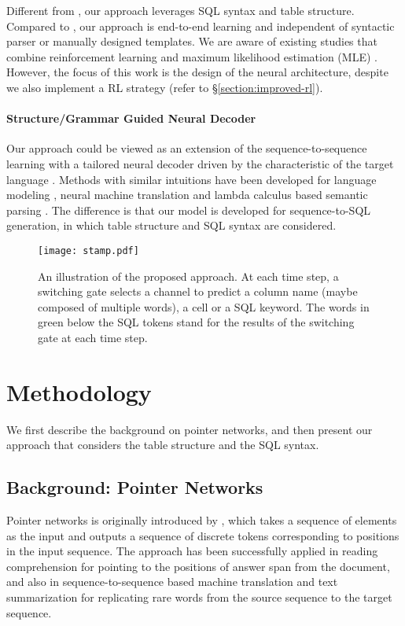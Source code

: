 \documentclass[11pt,a4paper]{article}
\begin{document}
Different from \cite{iyer-EtAl:2017:Long,zhong2017seq2sql}, our approach leverages SQL syntax and table structure.
Compared to \cite{popescu2003towards,giordani2012translating,yaghmazadeh2017type}, our approach is end-to-end learning and independent of syntactic parser or manually designed templates.
We are aware of existing studies that combine reinforcement learning and maximum likelihood estimation (MLE) \cite{guu-EtAl:2017:Long,mou17,liang-EtAl:2017:Long}. However, the focus of this work is the design of the neural architecture, despite we also implement a RL strategy (refer to \S \ref{section:improved-rl}).

\paragraph{Structure/Grammar Guided Neural Decoder}
Our approach could be viewed as an extension of the sequence-to-sequence learning \cite{sutskever2014sequence,Bahdanau2015} with a tailored neural decoder driven by the characteristic of the target language \cite{yin2017syntactic,rabinovich2017abstract}.
Methods with similar intuitions have been developed for language modeling \cite{dyer-EtAl:2016:N16-1}, neural machine translation \cite{wu-EtAl:2017:Long2} and lambda calculus based semantic parsing  \cite{dong-lapata:2016:P16-1,krishnamurthy-dasigi-gardner:2017:EMNLP2017}.
The difference is that our model is developed for sequence-to-SQL generation, in which table structure and SQL syntax are considered.



\begin{figure*}[t]
	\centering
	\texttt{[image: stamp.pdf]}
	\caption{An illustration of the proposed approach. At each time step, a switching gate selects a channel to predict a column name (maybe composed of multiple words), a cell or a SQL keyword. The words in green below the SQL tokens stand for the results of the switching gate at each time step.}
	\label{fig:model}
\end{figure*}

\section{Methodology}
We first describe the background on pointer networks, 
and then present our approach that considers the table structure and the SQL syntax.

\subsection{Background: Pointer Networks}
Pointer networks is originally introduced by \cite{vinyals2015pointer}, which takes a sequence of elements as the input and outputs a sequence of discrete tokens corresponding to positions in the input sequence.
The approach has been successfully applied in reading comprehension \cite{kadlec-EtAl:2016:P16-1} for pointing to the positions of answer span from the document, and also in sequence-to-sequence based machine translation \cite{gulcehre-EtAl:2016:P16-1} and text summarization \cite{gu-EtAl:2016:P16-1} for replicating rare words from the source sequence to the target sequence.
\end{document}
